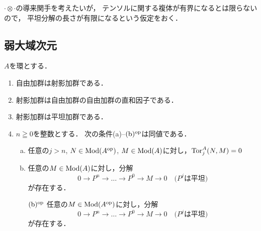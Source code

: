 \(\cdot\otimes\cdot\)の導来関手を考えたいが，
テンソルに関する複体が有界になるとは限らないので，
平坦分解の長さが有限になるという仮定をおく．

\subsection{弱大域次元}
\begin{PRP}
    \(A\)を環とする．
    \begin{enumerate}
        \item 自由加群は射影加群である．
        
        \item 射影加群は自由加群の自由加群の直和因子である．
        
        \item 射影加群は平坦加群である．
        
        \item \(n\geqq0\)を整数とする．
            次の条件(a)--\((\text{b})^{{\rm op}}\)は同値である．
            \begin{enumerate}[(a)]
                \item 任意の\(j>n\), \(N\in\mathop{\mathrm{Mod}}\nolimits(A^{\rm op})\), 
                \(M\in\mathop{\mathrm{Mod}}\nolimits(A)\)に対し，\(\mathop{\mathrm{Tor}}\nolimits_j^A(N,M)=0\)
                \item 任意の\(M\in\mathop{\mathrm{Mod}}\nolimits(A)\)に対し，分解\[
                    0\to P^n\to\dots\to P^0\to M\to0\quad\text{(\(P^j\)は平坦)}
                    \]が存在する．
                \item[\((\text{b})^{{\rm op}}\)]\setlength{\leftskip}{10pt}
                任意の\(M\in\mathop{\mathrm{Mod}}\nolimits(A^{\rm op})\)に対し，分解\[
                    0\to P^n\to\dots\to P^0\to M\to0\quad\text{(\(P^j\)は平坦)}
                \]が存在する．
            \end{enumerate}
    \end{enumerate}
\end{PRP}

